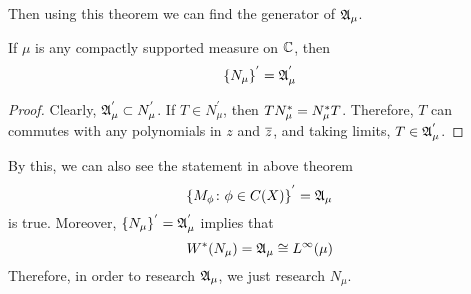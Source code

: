 \documentclass[a4paper,11pt]{report}
\begin{document}
Then using this theorem we can find the generator of $\mathfrak{A}_{\mu}$.
\begin{thm}
	If $\mu$ is any compactly supported measure on $\mathbb{C}$, then
	\begin{equation*}
		\{N_{\mu}\}^{'} = \mathfrak{A}_{\mu}^{'}
	\end{equation*}
\end{thm}
\begin{proof}
	Clearly, $\mathfrak{A}_{\mu}^{'} \subset N_{\mu}^{'}$. If $T \in N_{\mu}^{'}$, then $TN_{\mu}^{*} = N_{\mu}^{*}T$. Therefore, $T$ can commutes with any polynomials in $z$ and $\overline{z}$, and taking limits, $T \in \mathfrak{A}_{\mu}^{'}$.
\end{proof}
\begin{rem}
	By this, we can also see the statement in above theorem
	\begin{equation*}
		{\{M_{\phi} \colon \phi \in C(X)\}}^{'} = \mathfrak{A}_{\mu}
	\end{equation*}
	is true. Moreover, $\{N_{\mu}\}^{'} = \mathfrak{A}_{\mu}^{'}$ implies that
	\begin{equation*}
		W^{*}(N_{\mu}) = \mathfrak{A}_{\mu} \cong L^{\infty}(\mu)
	\end{equation*}
	Therefore, in order to research $\mathfrak{A}_{\mu}$, we just research $N_{\mu}$.
\end{rem}
\end{document}
